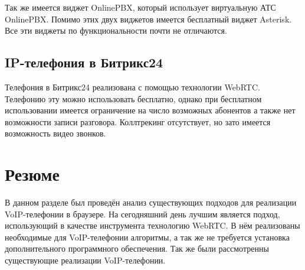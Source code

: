 Так же имеется виджет OnlinePBX, который использует виртуальную АТС OnlinePBX. Помимо этих двух виджетов имеется бесплатный виджет Asterisk. Все эти виджеты по функциональности почти не отличаются.

\subsection{IP-телефония в Битрикс24}

Телефония в Битрикс24 реализована с помощью технологии WebRTC. Телефонию эту можно использовать бесплатно, однако при бесплатном использовании имеется ограничение на число возможных абонентов а также нет возможности записи разговора. Коллтрекинг отсутствует, но зато имеется возможность видео звонков.\cite{bitrix24}

\section{Резюме}

В данном разделе был проведён анализ существующих подходов для реализации VoIP-телефонии в браузере. На сегодняшний день лучшим является подход, использующий в качестве инструмента технологию WebRTC. В нём реализованы необходимые для VoIP-телефонии алгоритмы, а так же не требуется установка дополнительного программного обеспечения. Так же были рассмотренны существующие реализации VoIP-телефонии.
